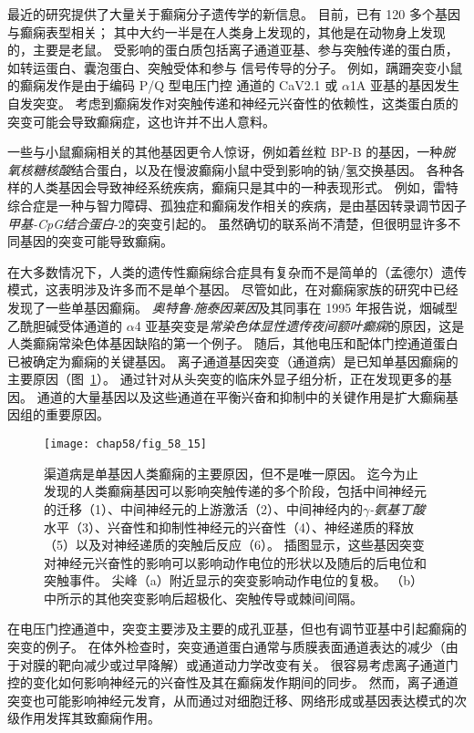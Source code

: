 最近的研究提供了大量关于癫痫分子遗传学的新信息。 目前，已有 120 多个基因与癫痫表型相关；
其中大约一半是在人类身上发现的，其他是在动物身上发现的，主要是老鼠。
受影响的蛋白质包括离子通道亚基、参与突触传递的蛋白质，如转运蛋白、囊泡蛋白、突触受体和参与  信号传导的分子。
例如，蹒跚突变小鼠的癫痫发作是由于编码 P/Q 型电压门控  通道的 CaV2.1 或 $\alpha$1A 亚基的基因发生自发突变。
考虑到癫痫发作对突触传递和神经元兴奋性的依赖性，这类蛋白质的突变可能会导致癫痫症，这也许并不出人意料。


一些与小鼠癫痫相关的其他基因更令人惊讶，例如着丝粒 BP-B 的基因，一种\textit{脱氧核糖核酸}结合蛋白，以及在慢波癫痫小鼠中受到影响的钠/氢交换基因。
各种各样的人类基因会导致神经系统疾病，癫痫只是其中的一种表现形式。
例如，雷特综合症是一种与智力障碍、孤独症和癫痫发作相关的疾病，是由基因转录调节因子\textit{甲基-CpG结合蛋白}-2的突变引起的。
虽然确切的联系尚不清楚，但很明显许多不同基因的突变可能导致癫痫。


在大多数情况下，人类的遗传性癫痫综合症具有复杂而不是简单的（孟德尔）遗传模式，这表明涉及许多而不是单个基因。
尽管如此，在对癫痫家族的研究中已经发现了一些单基因癫痫。
\textit{奥特鲁$\cdot$施泰因莱因}及其同事在 1995 年报告说，烟碱型乙酰胆碱受体通道的 $\alpha$4 亚基突变是\textit{常染色体显性遗传夜间额叶癫痫}的原因，这是人类癫痫常染色体基因缺陷的第一个例子。
随后，其他电压和配体门控通道蛋白已被确定为癫痫的关键基因。
离子通道基因突变（通道病）是已知单基因癫痫的主要原因（图~\ref{fig:58_15}）。
通过针对从头突变的临床外显子组分析，正在发现更多的基因。
 通道的大量基因以及这些通道在平衡兴奋和抑制中的关键作用是扩大癫痫基因组的重要原因。


\begin{figure}[htbp]
	\centering
	\texttt{[image: chap58/fig\_58\_15]}
	\caption{渠道病是单基因人类癫痫的主要原因，但不是唯一原因。
		迄今为止发现的人类癫痫基因可以影响突触传递的多个阶段，包括中间神经元的迁移（1）、中间神经元的上游激活（2）、中间神经内的\textit{$\gamma$-氨基丁酸}水平（3）、兴奋性和抑制性神经元的兴奋性（4）、神经递质的释放（5）以及对神经递质的突触后反应（6）。
		插图显示，这些基因突变对神经元兴奋性的影响可以影响动作电位的形状以及随后的后电位和突触事件。
		尖峰（a）附近显示的突变影响动作电位的复极。
		（b）中所示的其他突变影响后超极化、突触传导或棘间间隔。}
	\label{fig:58_15}
\end{figure}


在电压门控通道中，突变主要涉及主要的成孔亚基，但也有调节亚基中引起癫痫的突变的例子。
在体外检查时，突变通道蛋白通常与质膜表面通道表达的减少（由于对膜的靶向减少或过早降解）或通道动力学改变有关。
很容易考虑离子通道门控的变化如何影响神经元的兴奋性及其在癫痫发作期间的同步。
然而，离子通道突变也可能影响神经元发育，从而通过对细胞迁移、网络形成或基因表达模式的次级作用发挥其致癫痫作用。


